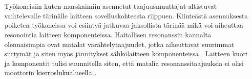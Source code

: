 \documentclass[finnish,12pt,a4paper,pdftex,elec,utf8]{aaltothesis}
\begin{document}
\\\\ 
Työkoneisiin kuten murskaimiin asennetut taajuusmuuttajat altistuvat vaihtelevalle tärinälle laitteen sovelluskohteesta riippuen. Kiinteästä asennuksesta poiketen työkoneissa voi esiintyä jatkuvaa jaksollista tärinää mikä voi aiheuttaa resonointia laitteen komponenteissa. Haitallisen resonanssin kannalta olennaisimpia ovat matalat värähtelytaajuudet, jotka aiheuttavat suurimmat siirtymät ja siten myös jännitykset sähkölaitteen komponenteissa \cite{Vibration}. Laitteen kuori ja komponentit tulisi suunnitella siten, että matalia resonanssitaajuuksia ei olisi moottorin kierroslukualueella \cite{Vibration}.
\end{document}
